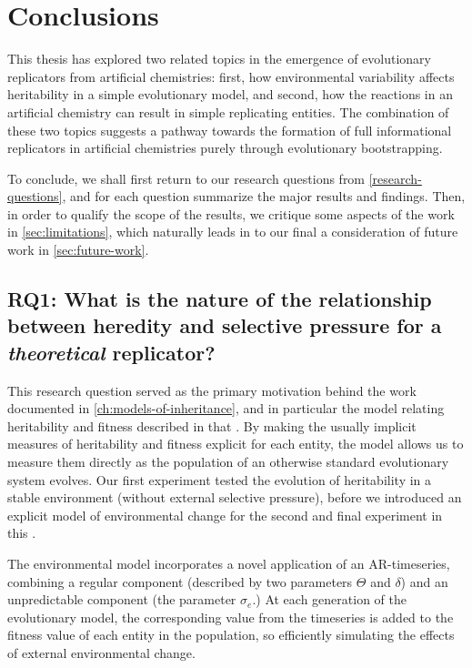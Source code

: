 \chapter{Conclusions}\label{ch:thesis-conclusions}

This thesis has explored two related topics in the emergence of evolutionary replicators from artificial chemistries: first, how environmental variability affects heritability in a simple evolutionary model, and second, how the reactions in an artificial chemistry can result in simple replicating entities. The combination of these two topics suggests a pathway towards the formation of full informational replicators in artificial chemistries purely through evolutionary bootstrapping.

To conclude, we shall first return to our research questions from \cref{research-questions}, and for each question summarize the major results and findings. Then, in order to qualify the scope of the results, we critique some aspects of the work in \cref{sec:limitations}, which naturally leads in to our final  a consideration of future work in \cref{sec:future-work}.

\section{RQ1: What is the nature of the relationship between heredity and selective pressure for a \emph{theoretical} replicator?}

This research question served as the primary motivation behind the work documented in \cref{ch:models-of-inheritance}, and in particular the model relating heritability and fitness described in that . By making the usually implicit measures of heritability and fitness explicit for each entity, the model allows us to measure them directly as the population of an otherwise standard evolutionary system evolves. Our first experiment tested the evolution of heritability in a stable environment (without external selective pressure), before we introduced an explicit model of environmental change for the second and final experiment in this . 

The environmental model incorporates a novel application of an AR-timeseries, combining a regular component (described by two parameters $\Theta$ and $\delta$) and an unpredictable component (the parameter $\sigma_e$.) At each generation of the evolutionary model, the corresponding value from the timeseries is added to the fitness value of each entity in the population, so efficiently simulating the effects of external environmental change.

